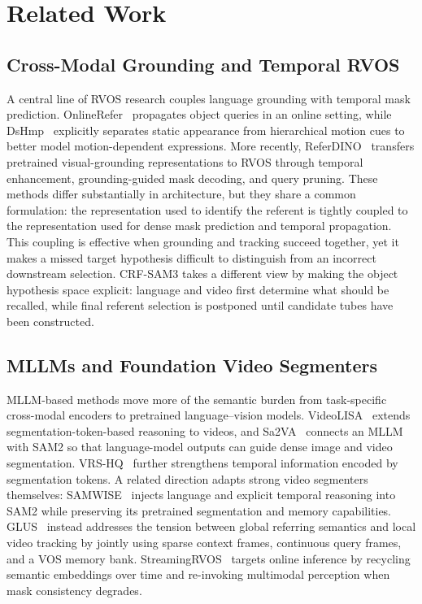\section{Related Work}

\subsection{Cross-Modal Grounding and Temporal RVOS}
A central line of RVOS research couples language grounding with temporal mask prediction. OnlineRefer~\cite{wu2023onlinerefer} propagates object queries in an online setting, while DsHmp~\cite{he2024dshmp} explicitly separates static appearance from hierarchical motion cues to better model motion-dependent expressions. More recently, ReferDINO~\cite{liang2025referdino} transfers pretrained visual-grounding representations to RVOS through temporal enhancement, grounding-guided mask decoding, and query pruning. These methods differ substantially in architecture, but they share a common formulation: the representation used to identify the referent is tightly coupled to the representation used for dense mask prediction and temporal propagation. This coupling is effective when grounding and tracking succeed together, yet it makes a missed target hypothesis difficult to distinguish from an incorrect downstream selection. CRF-SAM3 takes a different view by making the object hypothesis space explicit: language and video first determine what should be recalled, while final referent selection is postponed until candidate tubes have been constructed.

\subsection{MLLMs and Foundation Video Segmenters}
MLLM-based methods move more of the semantic burden from task-specific cross-modal encoders to pretrained language--vision models. VideoLISA~\cite{bai2024videolisa} extends segmentation-token-based reasoning to videos, and Sa2VA~\cite{yuan2025sa2va} connects an MLLM with SAM2 so that language-model outputs can guide dense image and video segmentation. VRS-HQ~\cite{gong2025vrshq} further strengthens temporal information encoded by segmentation tokens. A related direction adapts strong video segmenters themselves: SAMWISE~\cite{cuttano2024samwise} injects language and explicit temporal reasoning into SAM2 while preserving its pretrained segmentation and memory capabilities. GLUS~\cite{lin2025glus} instead addresses the tension between global referring semantics and local video tracking by jointly using sparse context frames, continuous query frames, and a VOS memory bank. StreamingRVOS~\cite{zhang2026streamingrvos} targets online inference by recycling semantic embeddings over time and re-invoking multimodal perception when mask consistency degrades.

